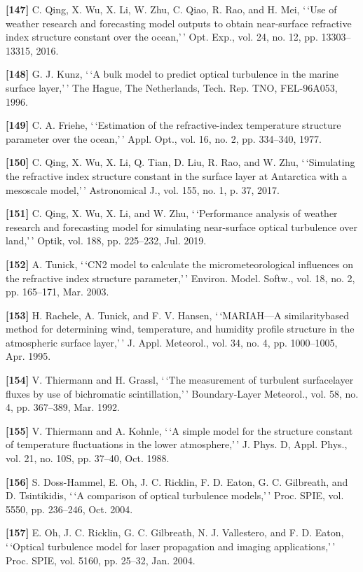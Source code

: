 \documentclass[
]{article}
\begin{document}
\textbf{{[}147{]}} C. Qing, X. Wu, X. Li, W. Zhu, C. Qiao, R. Rao, and
H. Mei, `\,`Use of weather research and forecasting model outputs to
obtain near-surface refractive index structure constant over the
ocean,'\,' Opt. Exp., vol. 24, no. 12, pp. 13303--13315, 2016.

\textbf{{[}148{]}} G. J. Kunz, `\,`A bulk model to predict optical
turbulence in the marine surface layer,'\,' The Hague, The Netherlands,
Tech. Rep. TNO, FEL-96A053, 1996.

\textbf{{[}149{]}} C. A. Friehe, `\,`Estimation of the refractive-index
temperature structure parameter over the ocean,'\,' Appl. Opt., vol. 16,
no. 2, pp. 334--340, 1977.

\textbf{{[}150{]}} C. Qing, X. Wu, X. Li, Q. Tian, D. Liu, R. Rao, and
W. Zhu, `\,`Simulating the refractive index structure constant in the
surface layer at Antarctica with a mesoscale model,'\,' Astronomical J.,
vol. 155, no. 1, p. 37, 2017.

\textbf{{[}151{]}} C. Qing, X. Wu, X. Li, and W. Zhu, `\,`Performance
analysis of weather research and forecasting model for simulating
near-surface optical turbulence over land,'\,' Optik, vol. 188, pp.
225--232, Jul. 2019.

\textbf{{[}152{]}} A. Tunick, `\,`CN2 model to calculate the
micrometeorological influences on the refractive index structure
parameter,'\,' Environ. Model. Softw., vol. 18, no. 2, pp. 165--171,
Mar. 2003.

\textbf{{[}153{]}} H. Rachele, A. Tunick, and F. V. Hansen,
`\,`MARIAH---A similaritybased method for determining wind, temperature,
and humidity profile structure in the atmospheric surface layer,'\,' J.
Appl. Meteorol., vol. 34, no. 4, pp. 1000--1005, Apr. 1995.

\textbf{{[}154{]}} V. Thiermann and H. Grassl, `\,`The measurement of
turbulent surfacelayer fluxes by use of bichromatic scintillation,'\,'
Boundary-Layer Meteorol., vol. 58, no. 4, pp. 367--389, Mar. 1992.

\textbf{{[}155{]}} V. Thiermann and A. Kohnle, `\,`A simple model for
the structure constant of temperature fluctuations in the lower
atmosphere,'\,' J. Phys. D, Appl. Phys., vol. 21, no. 10S, pp. 37--40,
Oct. 1988.

\textbf{{[}156{]}} S. Doss-Hammel, E. Oh, J. C. Ricklin, F. D. Eaton, G.
C. Gilbreath, and D. Tsintikidis, `\,`A comparison of optical turbulence
models,'\,' Proc. SPIE, vol. 5550, pp. 236--246, Oct. 2004.

\textbf{{[}157{]}} E. Oh, J. C. Ricklin, G. C. Gilbreath, N. J.
Vallestero, and F. D. Eaton, `\,`Optical turbulence model for laser
propagation and imaging applications,'\,' Proc. SPIE, vol. 5160, pp.
25--32, Jan. 2004.
\end{document}
